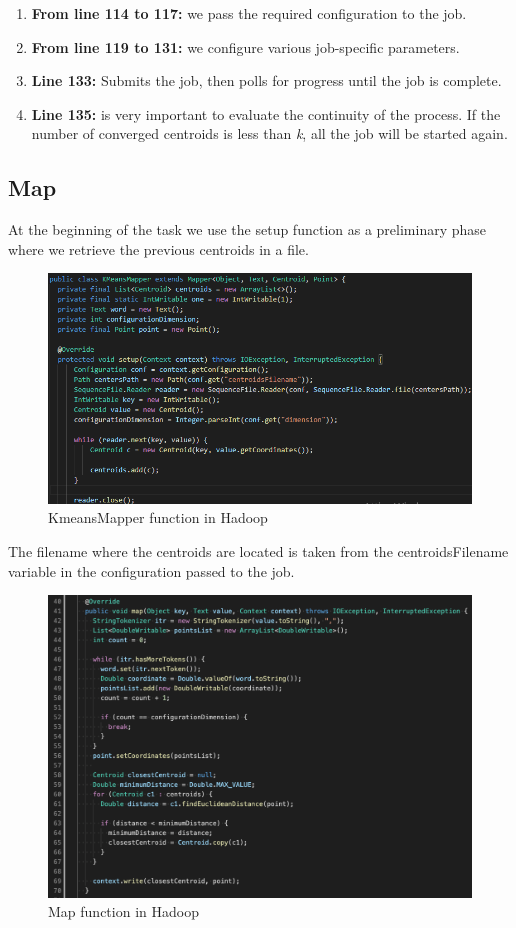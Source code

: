 \documentclass{book}
\begin{document}
    \begin{enumerate}
        \item \textbf{From line 114 to 117:} we pass the required configuration to the job. 
        \item \textbf{From line 119 to 131:} we configure various job-specific parameters. 
        \item \textbf{Line 133:} Submits the job, then polls for progress until the job is complete.
        \item \textbf{Line 135:} is very important to evaluate the continuity of the process. If the number of converged centroids is less than \textit{k}, all the job will be started again. 
    \end{enumerate}

    \subsection{Map}

    At the beginning of the task we use the setup function as a preliminary phase where we retrieve the previous centroids in a file. 
    
    \begin{figure}[H]
        \includegraphics[width=12cm]{code/kMeansMapper}
        \centering
        \caption{KmeansMapper function in Hadoop}
    \end{figure}

    The filename where the centroids are located is taken from the centroidsFilename variable in the configuration passed to the job. 

    \begin{figure}[H]
        \includegraphics[width=12cm]{code/map}
        \centering
        \caption{Map function in Hadoop}
    \end{figure}
\end{document}
